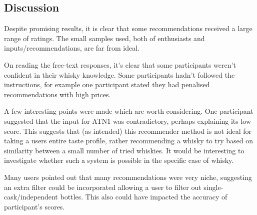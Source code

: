 \subsection{Discussion}\label{sec:disc}
Despite promising results, it is clear that some 
recommendations received a large range of ratings.  The small samples used, both of enthusiasts and 
inputs/recommendations, are far from ideal.

On reading the free-text responses, it's clear that some participants weren't confident
in their whisky knowledge. Some participants hadn't followed the instructions, for example
one participant stated they had penalised recommendations with high prices.

A few interesting points were made which are worth considering.  One participant suggested that the input
for ATN1 was contradictory, perhaps explaining its low score. This suggests that (as intended) this 
recommender method is not ideal for taking a users entire taste profile, 
rather recommending a whisky to try based on similarity between a small number of tried whiskies.  It would
be interesting to investigate whether such a system is possible in the specific case of whisky.

Many users pointed out that many recommendations were very niche, suggesting an extra filter could be
incorporated allowing a user to filter out single-cask/independent bottles.  This also could have impacted
the accuracy of participant's scores.